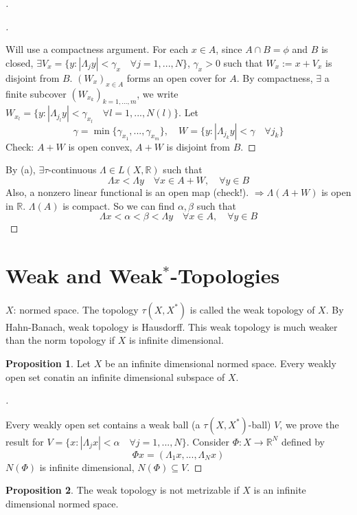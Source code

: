 \documentclass{article}
\theoremstyle{definition}
\newtheorem{prop}{Proposition}
\newenvironment{proofs}[1][\proofname]{%
  \begin{proof}[#1]$ $\par\nobreak\ignorespaces
}{%
  \end{proof}
}
\newcommand{\RR}{\mathbb R}
\newcommand{\Ra}{\Rightarrow}
\begin{document}
\begin{proofs}
	\begin{proofs}
		Will use a compactness argument.
		For each $x \in A$, since $A \cap B = \phi$ and $B$ is closed, $\exists V_x = \{y: |\Lambda_j y| < \gamma_x \quad \forall j = 1, ..., N\}$, $\gamma_x > 0$ such that $W_x := x + V_x$ is disjoint from $B$.
		$(W_x)_{x \in A}$ forms an open cover for $A$.
		By compactness, $\exists$ a finite subcover $(W_{x_k})_{k = 1, ..., m}$, we write $W_{x_l} = \{y: |\Lambda_{j_l} y| < \gamma_{x_l} \quad \forall l = 1, ..., N(l)\}$.
		Let 
		\[
			\gamma = \min\{\gamma_{x_1}, ..., \gamma_{x_m}\}, \quad W = \{y: |\Lambda_{j_k} y| < \gamma \quad \forall j_k\}
		\]
		Check: $A + W$ is open convex, $A + W$ is disjoint from $B$.
	\end{proofs}
	By (a), $\exists \tau$-continuous $\Lambda \in L(X, \RR)$ such that
	\[
		\Lambda x < \Lambda y \quad \forall x \in A + W, \quad \forall y \in B
	\]
	Also, a nonzero linear functional is an open map (check!).
	$\Ra \Lambda(A + W)$ is open in $\RR$.
	$\Lambda(A)$ is compact.
	So we can find $\alpha, \beta$ such that
	\[
		\Lambda x < \alpha < \beta < \Lambda y \quad \forall x \in A, \quad \forall y \in B
	\]
\end{proofs}

\section{Weak and Weak$^{*}$-Topologies}

$X$: normed space.
The topology $\tau(X, X^*)$ is called the weak topology of $X$.
By Hahn-Banach, weak topology is Hausdorff.
This weak topology is much weaker than the norm topology if $X$ is infinite dimensional.

\begin{prop}
	Let $X$ be an infinite dimensional normed space.
	Every weakly open set conatin an infinite dimensional subspace of $X$.
\end{prop}

\begin{proofs}
	Every weakly open set contains a weak ball (a $\tau(X, X^*)$-ball) $V$, we prove the result for $V = \{x: |\Lambda_j x| < \alpha \quad \forall j = 1, ..., N\}$.
	Consider $\Phi: X \to \RR^N$ defined by 
	\[
		\Phi x = (\Lambda_1 x, ..., \Lambda_N x)
	\]
	$N(\Phi)$ is infinite dimensional, $N(\Phi) \subseteq V$.
\end{proofs}

\begin{prop}
	The weak topology is not metrizable if $X$ is an infinite dimensional normed space.
\end{prop}
\end{document}
